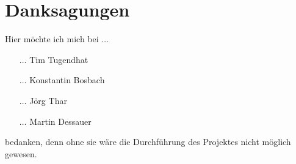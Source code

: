 \section*{Danksagungen}

Hier möchte ich mich bei \( \dots \)
\begin{itemize}
  \item[\( \dots \)] Tim Tugendhat
  \item[\( \dots \)] Konstantin Bosbach
  \item[\( \dots \)] Jörg Thar
  \item[\( \dots \)] Martin Dessauer
\end{itemize}
bedanken, denn ohne sie wäre die Durchführung des Projektes nicht möglich
gewesen.

